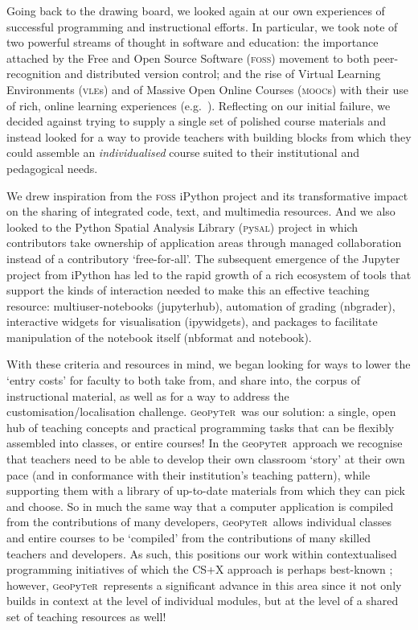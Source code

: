 \documentclass[letter, 11pt,titlepage]{article}
\newcommand{\gp}{\textsc{g}eo\textsc{p}y\textsc{t}e\textsc{r}~\/}
\newcommand{\eg}{e.g.~\/}
\begin{document}
Going back to the drawing board, we looked again at our own experiences of
successful programming and instructional efforts. In particular, we took note of
two powerful streams of thought in software and education: the importance
attached by the Free and Open Source Software (\textsc{foss}) movement to both
peer-recognition \citep{raymond_cathedral_1999} and distributed version control;
and the rise of Virtual Learning Environments (\textsc{vle}s) and of Massive
Open Online Courses (\textsc{mooc}s) with their use of rich, online learning
experiences (\eg \citealp{Trafford2011,Cabiria2012}). Reflecting on our initial
failure, we decided against trying to supply a single set of polished course
materials and instead looked for a way to provide teachers with building blocks
from which they could assemble an \textit{individualised} course suited to their
institutional and pedagogical needs.

We drew inspiration from the \textsc{foss} iPython project
\citep{perez_2007_ipython} and its transformative impact on the sharing of
integrated code, text, and multimedia resources. And we also looked to the
Python Spatial Analysis Library (\textsc{p}y\textsc{sal}) project
\cite{rey_19sea} in which contributors take ownership of application areas
through managed collaboration instead of a contributory `free-for-all'. The
subsequent emergence of the Jupyter project \citep{kluyver16} from iPython has
led to the rapid growth of a rich ecosystem of tools that support the kinds of
interaction needed to make this an effective teaching resource:
multiuser-notebooks (jupyterhub), automation of grading (nbgrader), interactive
widgets for visualisation (ipywidgets), and packages to facilitate manipulation
of the notebook itself (nbformat and notebook).

With these criteria and resources in mind, we began looking for ways to lower
the `entry costs' for faculty to both take from, and share into, the corpus of
instructional material, as well as for a way to address the
customisation/localisation challenge. \gp was our solution: a single, open hub
of teaching concepts and practical programming tasks that can be flexibly
assembled into classes, or entire courses! In the \gp approach we recognise that
teachers need to be able to develop their own classroom `story' at their own
pace (and in conformance with their institution's teaching pattern), while
supporting them with a library of up-to-date materials from which they can pick
and choose. So in much the same way that a computer application is compiled from
the contributions of many developers, \gp allows individual classes and entire
courses to be `compiled' from the contributions of many skilled teachers and
developers. As such, this positions our work within contextualised programming initiatives \citep{Guzdial2010,Lukkarinen2016} of which the CS+X approach is perhaps best-known \citep[\eg][]{Mir2017}; however, \gp represents a significant advance in this area since it not only builds in context at the level of individual modules, but at the level of a shared set of teaching resources as well!
\end{document}
